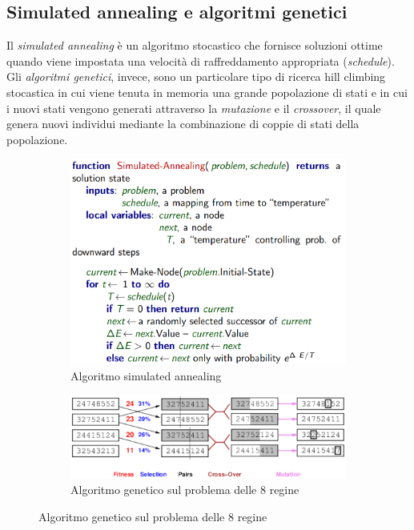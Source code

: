 \documentclass[11pt,oneside]{book}
\begin{document}
\subsection{Simulated annealing e algoritmi genetici}
Il \textit{simulated annealing} è un algoritmo stocastico che fornisce soluzioni ottime quando viene impostata una velocità di raffreddamento appropriata (\textit{schedule}). Gli \textit{algoritmi genetici}, invece, sono un particolare tipo di ricerca hill climbing stocastica in cui viene tenuta in memoria una grande popolazione di stati e in cui i nuovi stati vengono generati attraverso la \textit{mutazione} e il \textit{crossover}, il quale genera nuovi individui mediante la combinazione di coppie di stati della popolazione.
\begin{figure}[htp]
	\begin{subfigure}{0.49\textwidth}
	    \centering
		\includegraphics[width=\textwidth, height=\textheight, keepaspectratio]{simulated-annealing.png}
		\caption{Algoritmo simulated annealing}
	\end{subfigure}
	\hfill
	\begin{subfigure}{0.49\textwidth}
	    \centering
		\includegraphics[width=\textwidth, height=\textheight, keepaspectratio]{genetic.png}
		\caption{Algoritmo genetico sul problema delle 8 regine}
	\end{subfigure}
\end{figure}
\end{document}
